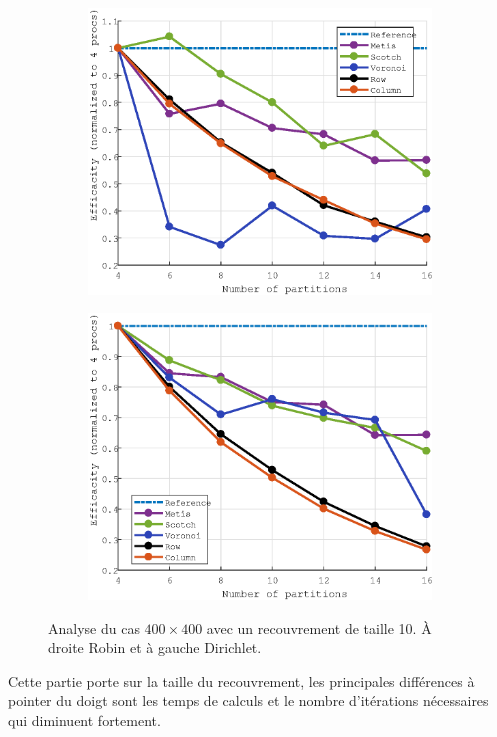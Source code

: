 \documentclass[a4paper,11pt]{article}
\begin{document}
\begin{figure}[H]\ContinuedFloat
	\begin{subfigure}[t]{0.45\textwidth}
		\centering
		\includegraphics[width=\textwidth]{robin_400x400_10_efficacity.eps}
	\end{subfigure}
	\hfill
	\begin{subfigure}[t]{0.45\textwidth}
		\centering
		\includegraphics[width=\textwidth]{dirichlet_400x400_10_efficacity.eps}
	\end{subfigure}
	\caption{Analyse du cas $400\times400$ avec un recouvrement de taille 10. À droite Robin et à gauche Dirichlet.}
\end{figure}
\noindent Cette partie porte sur la taille du recouvrement, les principales différences à pointer du doigt sont les temps de calculs et le nombre d'itérations nécessaires qui diminuent fortement.
\end{document}
